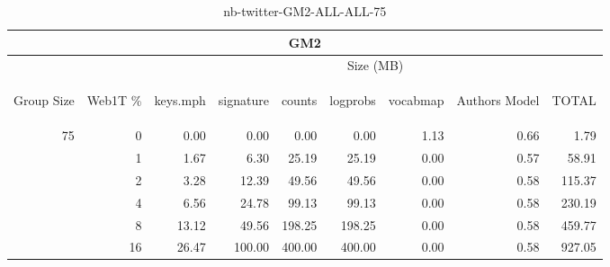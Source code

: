 \begin{center}
\begin{table}[htbp] 
 \begin{center}
\begin{tabular}{ | r | r | r | r | r | r | r | r | r |}
\hline
\multicolumn{9}{|c|}{GM2}\\
\hline
 & & \multicolumn{7}{|c|}{Size (MB)}\\ \cline{3-9}
\begin{sideways}Group Size\end{sideways} & \begin{sideways}Web1T \% \end{sideways} & \begin{sideways}keys.mph\end{sideways} & \begin{sideways}signature\end{sideways} & \begin{sideways}counts\end{sideways} & \begin{sideways}logprobs\end{sideways} & \begin{sideways}vocabmap\end{sideways} & \begin{sideways}Authors Model \end{sideways} & \begin{sideways}TOTAL\end{sideways}\\
\hline
\multirow{5}{*}{75}
 & 0 & 0.00 & 0.00 & 0.00 & 0.00 & 1.13 & 0.66 & 1.79\\ \cline{2-9}
 & 1 & 1.67 & 6.30 & 25.19 & 25.19 & 0.00 & 0.57 & 58.91\\ \cline{2-9}
 & 2 & 3.28 & 12.39 & 49.56 & 49.56 & 0.00 & 0.58 & 115.37\\ \cline{2-9}
 & 4 & 6.56 & 24.78 & 99.13 & 99.13 & 0.00 & 0.58 & 230.19\\ \cline{2-9}
 & 8 & 13.12 & 49.56 & 198.25 & 198.25 & 0.00 & 0.58 & 459.77\\ \cline{2-9}
 & 16 & 26.47 & 100.00 & 400.00 & 400.00 & 0.00 & 0.58 & 927.05\\ \cline{2-9}
\hline
\end{tabular}
\caption{nb-twitter-GM2-ALL-ALL-75}
\label{table:nb-twitter-GM2-ALL-ALL-75}
\end{center}
 \end{table}
\end{center}

